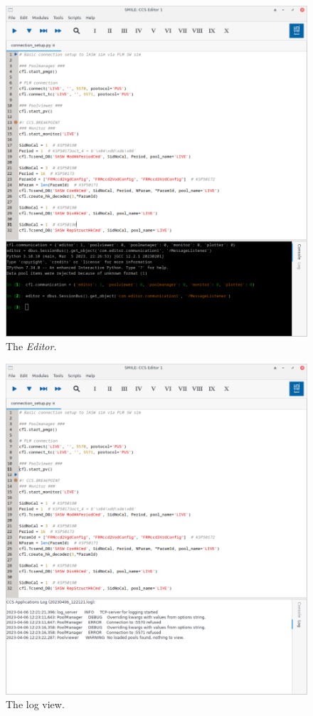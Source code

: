 \begin{figure}\label{fig:editor}
\includegraphics[width=1.\textwidth]{../shared/images/editor.png} 
\caption{The \emph{Editor}.}
\end{figure}

\begin{figure}\label{fig:editorlog}
\includegraphics[width=1.\textwidth]{../shared/images/editor_log.png} 
\caption{The log view.}
\end{figure}

